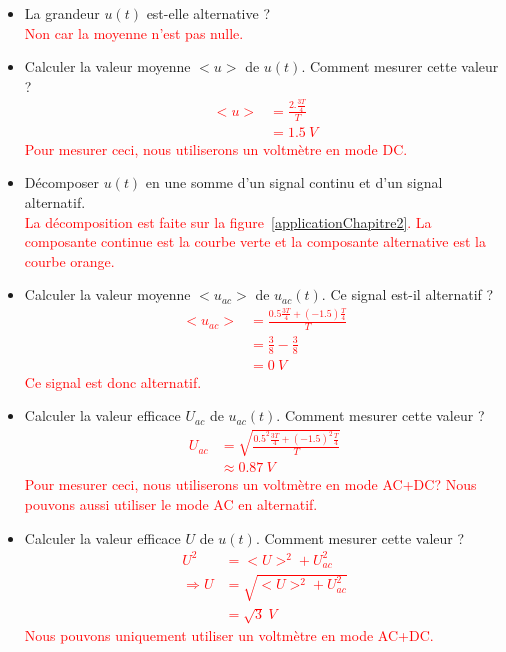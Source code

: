 \documentclass[12pt,a4paper,openany]{book}
\begin{document}
\begin{itemize}
\item La grandeur $ u(t) $ est-elle alternative ?\\
\textcolor{red}{Non car la moyenne n'est pas nulle.}
\item Calculer la valeur moyenne $ <u> $ de $ u(t) $. Comment mesurer cette valeur ?\\
\textcolor{red}{
\begin{align*}
<u> & = \frac{2.\frac{3T}{4}}{T}\\
	& = 1.5~V
\end{align*}
Pour mesurer ceci, nous utiliserons un voltmètre en mode DC.}
\item Décomposer $ u(t) $ en une somme d'un signal continu et d'un signal alternatif.\\
\textcolor{red}{La décomposition est faite sur la figure~\ref{applicationChapitre2}. La composante continue est la courbe verte et la composante alternative est la courbe orange.}
\item Calculer la valeur moyenne $ <u_{ac}> $ de $ u_{ac}(t) $. Ce signal est-il alternatif ?\\
\textcolor{red}{
\begin{align*}
<u_{ac}> & = \frac{0.5\frac{3T}{4} + (-1.5)\frac{T}{4}}{T}\\
		 & = \frac{3}{8} - \frac{3}{8}\\
		 & = 0~V
\end{align*}
Ce signal est donc alternatif.
}
\item Calculer la valeur efficace $ U_{ac} $ de $ u_{ac}(t) $. Comment mesurer cette valeur ?\\
\textcolor{red}{
\begin{align*}
U_{ac} & = \sqrt{\frac{0.5^{2}\frac{3T}{4} + (-1.5)^{2}\frac{T}{4}}{T}}\\
	   & \approx 0.87~V
\end{align*}
Pour mesurer ceci, nous utiliserons un voltmètre en mode AC+DC? Nous pouvons aussi utiliser le mode AC en alternatif.}
\item Calculer la valeur efficace $ U $ de $ u(t) $. Comment mesurer cette valeur ?\\
\textcolor{red}{
\begin{align*}
U^{2} & = <U>^{2} + U^{2}_{ac}\\
\Rightarrow U & = \sqrt{<U>^{2} + U^{2}_{ac}}\\
			  & = \sqrt{3}~V
\end{align*}
Nous pouvons uniquement utiliser un voltmètre en mode AC+DC.
}
\end{itemize}
\end{document}
